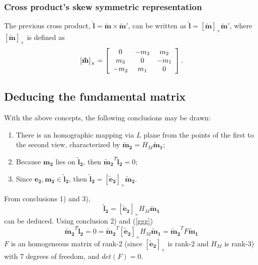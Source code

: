 \subsubsection{Cross product's skew symmetric representation}
The previous cross product, $\mathbf{\tilde{l}} = \mathbf{\tilde{m}} \times \mathbf{\tilde{m}'}$, can be written as $\mathbf{\tilde{l}} = [\mathbf{\tilde{m}}]_{\times} \mathbf{\tilde{m}'}$, where $[\mathbf{\tilde{m}}]_{\times}$ is defined as
\begin{equation}
\label{sec2:eq:crossp}
\left[ \mathbf{\tilde{m}} \right]_ { \times } =  \left[ \begin{array} { c c c } { 0 } & { - m _ { 3 } } & { m _ { 2 } } \\ { m _ { 3 } } & { 0 } & { - m _ { 1 } } \\ { - m _ { 2 } } & { m _ { 1 } } & { 0 } \end{array} \right].
\end{equation}

\subsection{Deducing the fundamental matrix}

With the above concepts, the following conclusions may be drawn:
\begin{enumerate}
	\item There is an homographic mapping via $L$ plane from the points of the first to the second view, characterized by $\mathbf{\tilde{m}_2} = H_M \mathbf{\tilde{m}_1}$;
	\item Because $\mathbf{m_2}$ lies on $\mathbf{\tilde{l}_2}$, then $\mathbf{ \tilde{m}_2 } ^T \mathbf{\tilde{l}_2} = 0$;
	\item Since $\mathbf { e_2 }, \mathbf { m_2 } \in \mathbf{\tilde{l}_2}$, then $\mathbf{\tilde{l}_2} = [\mathbf{\tilde{e}_2}]_{\times} \mathbf{\tilde{m}_2}$.
\end{enumerate}
From conclusions 1) and 3), 
\begin{equation}
\label{ggg}
\mathbf{\tilde{l}_2} = [\mathbf{\tilde{e}_2}]_{\times} H_M \mathbf{\tilde{m}_1} 
\end{equation}
can be deduced. Using conclusion 2) and (\ref{ggg}) 
\begin{equation}
\label{sec2:eq:fundm}
\mathbf{\tilde{m}_2}^T \mathbf{\tilde{l}_2} = 0 = \mathbf{\tilde{m}_2}^T [\mathbf{\tilde{e}_2}]_{\times} H_M \mathbf{\tilde{m}_1}  = \mathbf{\tilde{m}_2}^T F \mathbf{\tilde{m}_1} 
\end{equation}
$F$ is an homogeneous matrix of rank-2 (since $[\mathbf{\tilde{e}_2}]_{\times}$ is rank-2 and $H_M$ is rank-3) with 7 degrees of freedom, and $det(F) = 0$.

